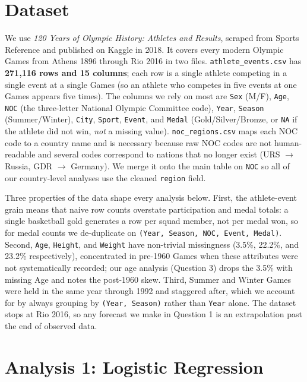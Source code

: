 \documentclass[11pt]{article}
\begin{document}
\section*{Dataset}

We use \textit{120 Years of Olympic History: Athletes and Results}, scraped from Sports Reference and published on Kaggle in 2018. It covers every modern Olympic Games from Athens 1896 through Rio 2016 in two files. \texttt{athlete\_events.csv} has \textbf{271{,}116 rows and 15 columns}; each row is a single athlete competing in a single event at a single Games (so an athlete who competes in five events at one Games appears five times). The columns we rely on most are \texttt{Sex} (M/F), \texttt{Age}, \texttt{NOC} (the three-letter National Olympic Committee code), \texttt{Year}, \texttt{Season} (Summer/Winter), \texttt{City}, \texttt{Sport}, \texttt{Event}, and \texttt{Medal} (Gold/Silver/Bronze, or \texttt{NA} if the athlete did not win, \textit{not} a missing value). \texttt{noc\_regions.csv} maps each NOC code to a country name and is necessary because raw NOC codes are not human-readable and several codes correspond to nations that no longer exist (URS $\to$ Russia, GDR $\to$ Germany). We merge it onto the main table on \texttt{NOC} so all of our country-level analyses use the cleaned \texttt{region} field.

Three properties of the data shape every analysis below. First, the athlete-event grain means that naive row counts overstate participation and medal totals: a single basketball gold generates a row per squad member, not per medal won, so for medal counts we de-duplicate on \texttt{(Year, Season, NOC, Event, Medal)}. Second, \texttt{Age}, \texttt{Height}, and \texttt{Weight} have non-trivial missingness (3.5\%, 22.2\%, and 23.2\% respectively), concentrated in pre-1960 Games when these attributes were not systematically recorded; our age analysis (Question 3) drops the 3.5\% with missing Age and notes the post-1960 skew. Third, Summer and Winter Games were held in the same year through 1992 and staggered after, which we account for by always grouping by \texttt{(Year, Season)} rather than \texttt{Year} alone. The dataset stops at Rio 2016, so any forecast we make in Question 1 is an extrapolation past the end of observed data.

\section*{Analysis 1: Logistic Regression}
\end{document}

